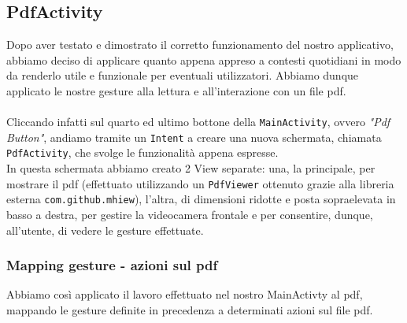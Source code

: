 \subsection{PdfActivity}
Dopo aver testato e dimostrato il corretto funzionamento del nostro applicativo, abbiamo deciso di applicare 
quanto appena appreso a contesti quotidiani in modo da renderlo utile e funzionale per eventuali 
utilizzatori. Abbiamo dunque applicato le nostre gesture alla lettura e all'interazione con un file pdf.\\
\\
\noindent Cliccando infatti sul quarto ed ultimo bottone della \texttt{MainActivity}, ovvero \textit{"Pdf Button"}, andiamo 
tramite un \texttt{Intent} a creare una nuova schermata, chiamata \texttt{PdfActivity}, che svolge le funzionalità 
appena espresse.\\
In questa schermata abbiamo creato 2 View separate: una, la principale, per 
mostrare il pdf (effettuato utilizzando un \texttt{PdfViewer} ottenuto grazie alla libreria esterna 
\texttt{com.github.mhiew}), l'altra, di dimensioni ridotte e posta sopraelevata in basso a destra, per 
gestire la videocamera frontale e per consentire, dunque, all'utente, di vedere le gesture 
effettuate.
\begin{figure}[H]
    \centering
\end{figure}

\subsubsection{Mapping gesture - azioni sul pdf }
Abbiamo così applicato il lavoro effettuato nel nostro MainActivty al pdf, mappando le gesture definite in precedenza a determinati azioni sul file pdf.

